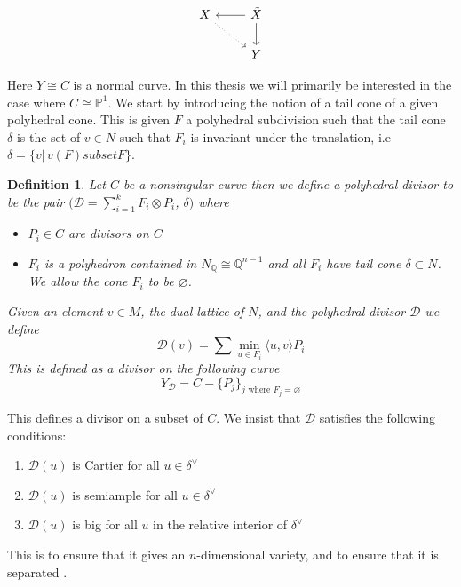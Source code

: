 \documentclass[11pt]{amsart}
\theoremstyle{plain}
\newtheorem{dfn}[thm]{Definition}
\begin{document}
\[
\begin{tikzcd}
X \arrow[rd, dotted] & \tilde{X} \arrow[l] \arrow[d]\\
& Y
\end{tikzcd}
\]

Here $Y \cong C$ is a normal curve. In this thesis we will primarily be interested in the case where $C \cong \mathbb{P}^1$. We start by introducing the notion of a tail cone of a given polyhedral cone. This is given $F$ a polyhedral subdivision such that the tail cone $\delta$ is the set of $v \in N$ such that $F_i$ is invariant under the translation, i.e $\delta = \{ v |\, v(F) subset F \}$.
\begin{dfn}
Let $C$ be a nonsingular curve then we define a polyhedral divisor to be the pair $(\mathcal{D} = \sum_{i = 1}^k F_i \otimes P_i$, $\delta)$ where
\begin{itemize}
\item $P_i \in C$ are divisors on $C$ 
\item $F_i$ is a polyhedron contained in $N_\mathbb{Q} \cong \mathbb{Q}^{n-1}$ and all $F_i$ have tail cone $\delta \subset N$.  We allow the cone $F_i$ to be $\varnothing$.
\end{itemize}
Given an element $v \in M$, the dual lattice of $N$, and the polyhedral divisor $\mathcal{D}$ we define
\[
\mathcal{D}(v) = \sum \min_{u \in F_i} \langle u, v \rangle P_i
\]
This is defined as a divisor on the following curve
\[
Y_\mathcal{D} = C - \{P_j\}_{j \text{ where } F_j = \varnothing}
\]
\end{dfn}

This defines a divisor on a subset of $C$. We insist that $\mathcal{D}$ satisfies the following conditions:
\begin{enumerate} 
\item $\mathcal{D}(u)$ is Cartier for all $u \in \delta^\vee $
\item $\mathcal{D}(u)$ is semiample for all $u \in \delta^\vee$
\item $\mathcal{D}(u)$ is big for all $u$ in the relative interior of $\delta^\vee$
\end{enumerate}
This is to ensure that it gives an $n$-dimensional variety, and to ensure that it is separated \cite{PS}.
\end{document}
